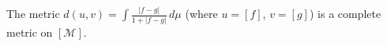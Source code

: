 The metric $d(u, v) = \int \frac{|f - g|}{1 + |f - g|} \, d\mu$ (where $u = [f]$, $v = [g]$) is a complete metric on $[\mathcal{M}]$.
